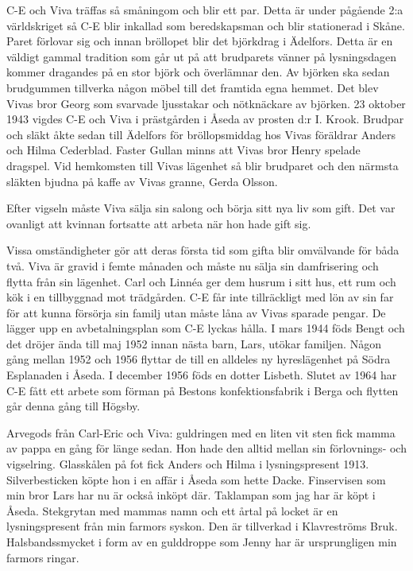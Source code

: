 C-E och Viva träffas så småningom och blir ett par. Detta är under pågående 2:a världskriget så C-E blir inkallad som beredskapsman och blir stationerad i Skåne. Paret förlovar sig och innan bröllopet blir det björkdrag i Ädelfors. Detta är en väldigt gammal tradition som går ut på att brudparets vänner på lysningsdagen kommer dragandes på en stor björk och överlämnar den. Av björken ska sedan brudgummen tillverka någon möbel till det framtida egna hemmet. Det blev Vivas bror Georg som svarvade ljusstakar och nötknäckare av björken.
23 oktober 1943 vigdes C-E och Viva i prästgården i Åseda av prosten d:r I. Krook. Brudpar och släkt åkte sedan till Ädelfors för bröllopsmiddag hos Vivas föräldrar Anders och Hilma Cederblad. Faster Gullan minns att Vivas bror Henry spelade dragspel. Vid hemkomsten till Vivas lägenhet så blir brudparet och den närmsta släkten bjudna på kaffe av Vivas granne, Gerda Olsson.

Efter vigseln måste Viva sälja sin salong och börja sitt nya liv som gift. Det var ovanligt att kvinnan fortsatte att arbeta när hon hade gift sig.

Vissa omständigheter gör att deras första tid som gifta blir omvälvande för båda två. Viva är gravid i femte månaden och måste nu sälja sin damfrisering och flytta från sin lägenhet. Carl och Linnéa ger dem husrum i sitt hus, ett rum och kök i en tillbyggnad mot trädgården. C-E får inte tillräckligt med lön av sin far för att kunna försörja sin familj utan måste låna av Vivas sparade pengar. De lägger upp en avbetalningsplan som C-E lyckas hålla. I mars 1944 föds Bengt och det dröjer ända till maj 1952 innan nästa barn, Lars, utökar familjen. Någon gång mellan 1952 och 1956 flyttar de till en alldeles ny hyreslägenhet på Södra Esplanaden i Åseda. I december 1956 föds en dotter Lisbeth.
Slutet av 1964 har C-E fått ett arbete som förman på Bestons konfektionsfabrik i Berga och flytten går denna gång till Högsby. 

Arvegods från Carl-Eric och Viva: guldringen med en liten vit sten fick mamma av pappa en gång för länge sedan. Hon hade den alltid mellan sin förlovnings- och vigselring. Glasskålen på fot fick Anders och Hilma i lysningspresent 1913. Silverbesticken köpte hon i en affär i Åseda som hette Dacke. Finservisen som min bror Lars har nu är också inköpt där. Taklampan som jag har är köpt i Åseda. 
Stekgrytan med mammas namn och ett årtal på locket är en lysningspresent från min farmors syskon. Den är tillverkad i Klavreströms Bruk.
Halsbandssmycket i form av en gulddroppe som Jenny har är ursprungligen min farmors ringar.


